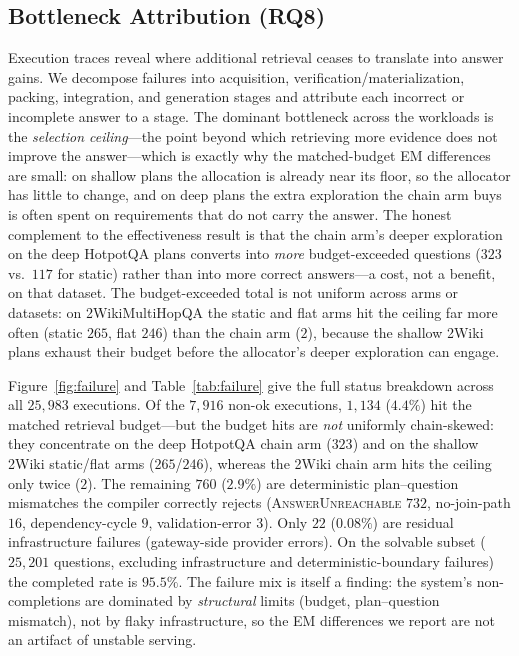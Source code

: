 \subsection{Bottleneck Attribution (RQ8)}
Execution traces reveal where additional retrieval ceases to translate into
answer gains. We decompose failures into acquisition, verification/materialization,
packing, integration, and generation stages and attribute each incorrect or
incomplete answer to a stage. The dominant bottleneck across the workloads is
the \emph{selection ceiling}---the point beyond which retrieving more evidence
does not improve the answer---which is exactly why the matched-budget EM
differences are small: on shallow plans the allocation is already near its
floor, so the allocator has little to change, and on deep plans the extra
exploration the chain arm buys is often spent on requirements that do not
carry the answer. The honest complement to the effectiveness result is that the chain arm's
deeper exploration on the deep HotpotQA plans converts into \emph{more}
budget-exceeded questions ($323$ vs.\ $117$ for static) rather than into more
correct answers---a cost, not a benefit, on that dataset. The budget-exceeded
total is not uniform across arms or datasets: on 2WikiMultiHopQA the static and
flat arms hit the ceiling far more often (static $265$, flat $246$) than the
chain arm ($2$), because the shallow 2Wiki plans exhaust their budget before
the allocator's deeper exploration can engage.

Figure~\ref{fig:failure} and Table~\ref{tab:failure} give the full status
breakdown across all $25{,}983$ executions. Of the $7{,}916$ non-ok executions,
$1{,}134$ ($4.4\%$) hit the matched retrieval budget---but the budget hits are
\emph{not} uniformly chain-skewed: they concentrate on the deep HotpotQA chain
arm ($323$) and on the shallow 2Wiki static/flat arms ($265$/$246$), whereas the
2Wiki chain arm hits the ceiling only twice ($2$). The remaining $760$ ($2.9\%$)
are deterministic
plan--question mismatches the compiler correctly rejects
(\textsc{AnswerUnreachable} $732$, no-join-path $16$, dependency-cycle $9$,
validation-error $3$). Only $22$ ($0.08\%$) are residual infrastructure
failures (gateway-side provider errors). On the solvable subset ($25{,}201$
questions, excluding infrastructure and deterministic-boundary failures) the
completed rate is $95.5\%$. The failure mix is itself a finding: the system's
non-completions are dominated by \emph{structural} limits (budget, plan--question
mismatch), not by flaky infrastructure, so the EM differences we report are not
an artifact of unstable serving.

